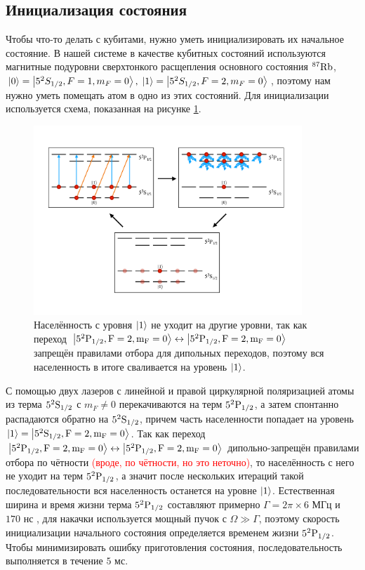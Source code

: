 \subsection{Инициализация состояния}

Чтобы что-то делать с кубитами, нужно уметь инициализировать их начальное состояние. В нашей системе в качестве кубитных состояний используются магнитные подуровни сверхтонкого расщепления основного состояния $^{87}\rm{Rb}$, $\left| 0 \right\rangle=\left| 5^2S_{1/2},F=1,m_F=0 \right\rangle, \; \left| 1 \right\rangle=\left| 5^2S_{1/2},F=2,m_F=0 \right\rangle$, поэтому нам нужно уметь помещать атом в одно из этих состояний. Для инициализации используется схема, показанная на рисунке \ref{fig:initialization}.

\begin{figure}[ht]
	\centering
	\includegraphics[width=0.9\textwidth]{images/initialization_scheme.pdf}
	\caption{Населённость с уровня $\left| 1 \right\rangle$ не уходит на другие уровни, так как переход $\left| 5^2\rm{P}_{1/2},F=2,m_F=0 \right\rangle\leftrightarrow \left| 5^2\rm{P}_{1/2},F=2,m_F=0 \right\rangle$ запрещён правилами отбора для дипольных переходов, поэтому вся населенность в итоге сваливается на уровень $\left| 1 \right\rangle$.}
	\label{fig:initialization}
\end{figure}

С помощью двух лазеров с линейной и правой циркулярной поляризацией атомы из терма $5^2\rm{S}_{1/2}$ с $m_F\neq0$ перекачиваются на терм $5^2\rm{P}_{1/2}$, а затем спонтанно распадаются обратно на $5^2\rm{S}_{1/2}$, причем часть населенности попадает на уровень $\left| 1 \right\rangle=\left| 5^2\rm{S}_{1/2},F=2,m_F=0 \right\rangle$. Так как переход $\left| 5^2\rm{P}_{1/2},F=2,m_F=0 \right\rangle\leftrightarrow \left| 5^2\rm{P}_{1/2},F=2,m_F=0 \right\rangle$ дипольно-запрещён правилами отбора по чётности \cite{Belousov} \textcolor{red}{(вроде, по чётности, но это неточно)}, то населённость с него не уходит на терм $5^2\rm{P}_{1/2}$, а значит после нескольких итераций такой последовательности вся населенность останется на уровне $\left| 1 \right\rangle$. Естественная ширина и время жизни терма $5^2\rm{P}_{1/2}$ составляют примерно $\Gamma = 2\pi \times 6 \text{ МГц}$ и $170 \text{ нс}$ \cite{Rb87}, для накачки используется мощный пучок с $\Omega \gg \Gamma$, поэтому скорость инициализации начального состояния определяется временем жизни $5^2\rm{P}_{1/2}$. Чтобы минимизировать ошибку приготовления состояния, последовательность выполняется в течение $5 \text{ мс}$.


